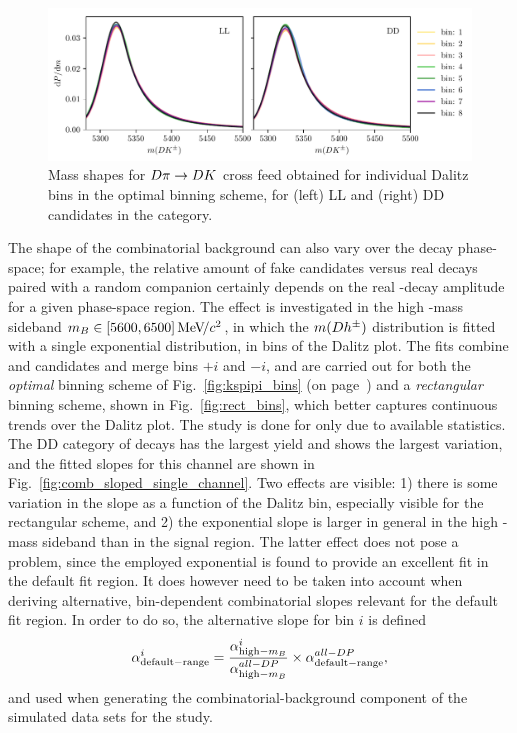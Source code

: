 \begin{figure}[tp]
    \centering
    \includegraphics[width=0.85\columnwidth]{figures/analysis/systematics/misID_bin_by_bin.pdf}
    \caption{Mass shapes for ${D}\pi \rightarrow{\ensuremath{D}}{\ensuremath{K}}$ cross feed obtained for individual Dalitz bins in the optimal binning scheme, for (left) LL and (right) DD candidates in the \DtoKspipi category.}
    \label{fig:misID_bin_by_bin}
\end{figure}

The shape of the combinatorial background can also vary over the \D decay phase-space; for example,  the relative amount of fake \D candidates versus real \D decays paired with a random companion certainly depends on the real \D-decay amplitude for a given phase-space region. The effect is investigated in the high \B-mass sideband $m_{B}\in[5600, 6500]\text{\,Me\kern -0.1em V\!/}c^2$, in which the $m({D} h^\pm)$ distribution is fitted with a single exponential distribution, in bins of the Dalitz plot. The fits combine \Bp and \Bm candidates and merge bins $+i$ and $-i$, and are carried out for both the \emph{optimal} binning scheme of Fig.~\ref{fig:kspipi_bins} (on page~\pageref{fig:kspipi_bins}) and a \emph{rectangular} binning scheme, shown in Fig.~\ref{fig:rect_bins}, which better captures continuous trends over the Dalitz plot. The study is done for \DtoKspipi only due to available statistics. The DD category of \BtoDpi decays has the largest yield and shows the largest variation, and the fitted slopes for this channel are shown in Fig.~\ref{fig:comb_sloped_single_channel}. Two effects are visible: 1) there is some variation in the slope as a function of the Dalitz bin, especially visible for the rectangular scheme, and 2) the exponential slope is larger in general in the high \B-mass sideband than in the signal region. The latter effect does not pose a problem, since the employed exponential is found to provide an excellent fit in the default fit region. It does however need to be taken into account when deriving alternative, bin-dependent combinatorial slopes relevant for the default fit region. In order to do so, the alternative slope for bin $i$ is defined
\begin{align}
    \alpha^i_\mathrm{default-range} = \frac{\alpha^i_{\mathrm{high-}m_{B}}}{\alpha^{all-DP}_{\mathrm{high-}m_{B}}}\times \alpha^{all-DP}_\mathrm{default-range},
\end{align}
and used when generating the combinatorial-background component of the simulated data sets for the study.


